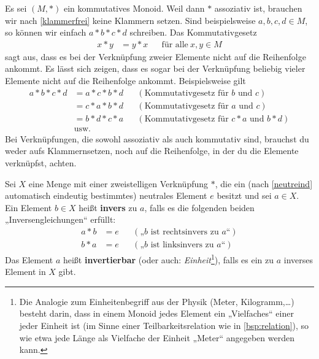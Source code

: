 \begin{bem} \label{reihenfolgeegal}
    Es sei $(M,*)$ ein kommutatives Monoid. Weil dann $*$ assoziativ ist, brauchen wir nach \cref{klammerfrei} keine Klammern setzen. Sind beispielsweise $a,b,c,d\in M$, so können wir einfach $a*b*c*d$ schreiben. Das Kommutativgesetz
    \begin{align*}
        x*y&=y*x && \text{für alle}\ x,y\in M
    \end{align*}
    sagt aus, dass es bei der Verknüpfung zweier Elemente nicht auf die Reihenfolge ankommt. Es lässt sich zeigen, dass es sogar bei der Verknüpfung beliebig vieler Elemente nicht auf die Reihenfolge ankommt. Beispielsweise gilt
    \begin{align*}
        a*b*c*d & = a*c*b*d && (\text{Kommutativgesetz für $b$ und $c$}) \\
        & = c*a*b*d && (\text{Kommutativgesetz für $a$ und $c$}) \\
        & = b*d*c*a && (\text{Kommutativgesetz für $c*a$ und $b*d$}) \\
        & \text{usw.}
    \end{align*}
    Bei Verknüpfungen, die sowohl assoziativ als auch kommutativ sind, brauchst du weder aufs Klammernsetzen, noch auf die Reihenfolge, in der du die Elemente verknüpfst, achten.
\end{bem}


\begin{defin} \label{def:inverse}  
    Sei $X$ eine Menge mit einer zweistelligen Verknüpfung $*$, die ein (nach \cref{neutreind} automatisch eindeutig bestimmtes) neutrales Element $e$ besitzt und sei $a\in X$. Ein Element $b\in X$ heißt \textbf{invers} zu $a$, falls es die folgenden beiden „Inversengleichungen“ erfüllt:
    \begin{align*}
        a*b & = e && (\text{„$b$ ist rechtsinvers zu $a$“}) \\
        b*a & = e && (\text{„$b$ ist linksinvers zu $a$“})
    \end{align*}
    Das Element $a$ heißt \textbf{invertierbar} (oder auch: \emph{Einheit}\footnote{Die Analogie zum Einheitenbegriff aus der Physik (Meter, Kilogramm,\dots) besteht darin, dass in einem Monoid jedes Element ein „Vielfaches“ einer jeder Einheit ist (im Sinne einer Teilbarkeitsrelation wie in \cref{bsp:relation}), so wie etwa jede Länge als Vielfache der Einheit „Meter“ angegeben werden kann.}), falls es ein zu $a$ inverses Element in $X$ gibt.
\end{defin}


